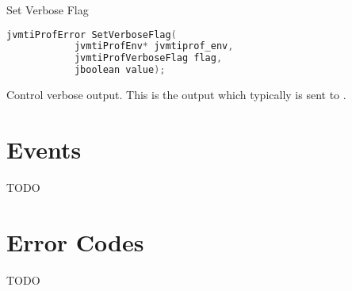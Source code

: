 \begin{apidef}{Set Verbose Flag}
\begin{lstlisting}[language=C]
jvmtiProfError SetVerboseFlag(
            jvmtiProfEnv* jvmtiprof_env,
            jvmtiProfVerboseFlag flag,
            jboolean value);
\end{lstlisting}

\begin{apidesc}
Control verbose output. This is the output which typically is sent to .

\end{apidesc}

\begin{apiphase}
\apiphaseany
\end{apiphase}

\begin{apicap}
\apicaprequired
\end{apicap}

\begin{apiparam}
\end{apiparam}

\apireturnempty

\begin{apierror}
\end{apierror}
\end{apidef}

\section{Events}

TODO

\section{Error Codes} \label{api:ec}

TODO
